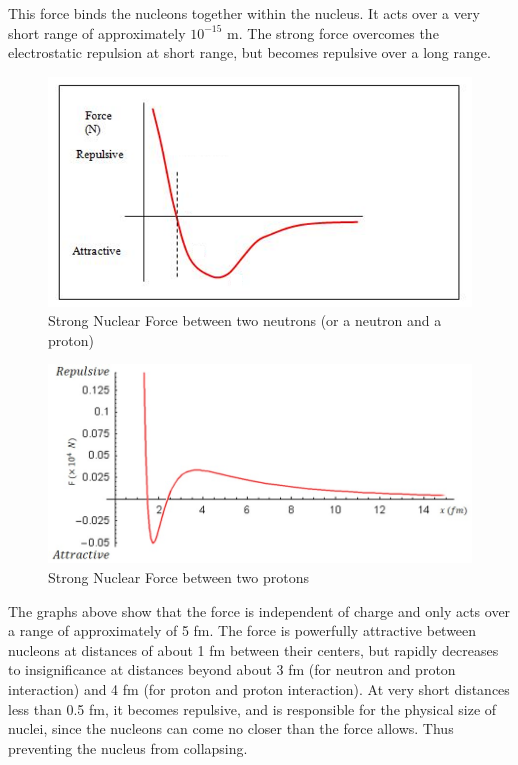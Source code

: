 This force binds the nucleons together within the nucleus. It acts over a very short range of approximately $10^{-15}$ m. The strong force overcomes the electrostatic repulsion at short range, but becomes repulsive over a long range. 


\begin{figure}[h!]
    \centering
    \includegraphics{notes/images/StrongNuclear5.JPG}
    \caption{Strong Nuclear Force between two neutrons (or a neutron and a proton)}
\end{figure}
\FloatBarrier

\begin{figure}[h!]
    \centering
    \includegraphics{notes/images/StrongNuclear4.JPG}
    \caption{Strong Nuclear Force between two protons}
\end{figure}
\FloatBarrier

The graphs above show that the force is independent of charge and only acts over a range of approximately of 5 fm. The force is powerfully attractive between nucleons at distances of about 1 fm between their centers, but rapidly decreases to insignificance at distances beyond about 3 fm (for neutron and proton interaction) and 4 fm (for proton and proton interaction). At very short distances less than 0.5 fm, it becomes repulsive, and is responsible for the physical size of nuclei, since the nucleons can come no closer than the force allows. Thus preventing the nucleus from collapsing.

